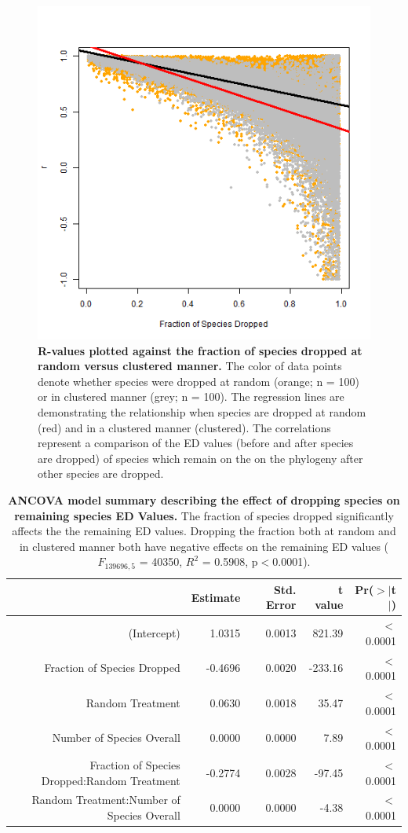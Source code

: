 \documentclass[12pt,english]{article}
\begin{document}
\begin{figure}[!ht]
  \center
  \includegraphics[width=.5\textwidth]{randomVsCluster.png}
  \caption{\textbf{R-values plotted against the fraction of species dropped at
  random versus clustered manner.} The color of data points denote whether
  species were dropped at random (orange; n = 100) or in clustered manner
  (grey; n = 100). The regression lines are demonstrating the relationship when
  species are dropped at random (red) and in a clustered manner (clustered). The
  correlations represent a comparison of the ED values (before and after
  species are dropped) of species which remain on the on the phylogeny after
  other species are dropped.}
  \label{randomVsClustered}
\end{figure}

\begin{table}[ht]
  \centering
  \begin{tabular}{rrrrr}
    \hline
      & Estimate & Std. Error & t value & Pr($>$$|$t$|$) \\
      \hline
      (Intercept) & 1.0315 & 0.0013 & 821.39 & $<$0.0001 \\
      Fraction of Species Dropped & -0.4696 & 0.0020 & -233.16 & $<$0.0001 \\
      Random Treatment & 0.0630 & 0.0018 & 35.47 & $<$0.0001 \\
      Number of Species Overall & 0.0000 & 0.0000 & 7.89 & $<$0.0001 \\
      Fraction of Species Dropped:Random Treatment & -0.2774 & 0.0028 & -97.45 & $<$0.0001 \\
      Random Treatment:Number of Species Overall & 0.0000 & 0.0000 & -4.38 & $<$0.0001 \\
      \hline
    \hline
  \end{tabular}
  \caption{\textbf{ANCOVA model summary describing the effect of
      dropping species on remaining species ED Values.} The fraction
    of species dropped significantly affects the the remaining ED
    values. Dropping the fraction both at random and in clustered
    manner both have negative effects on the remaining ED values
    ($F_{139696, 5}$ = 40350, $R^{2}$ = 0.5908, p$<$0.0001).}
  \label{missing_ancova}
\end{table}
\end{document}
